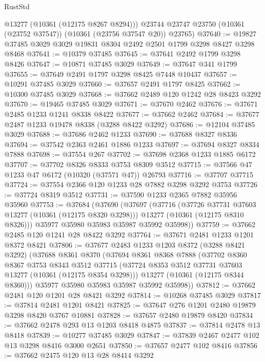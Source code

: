 \begin{lexlean}{RustStd}
\begin{coremodule}
        @13277
        (@10361 (@12175 @8267 @8294)))
      @23744
      @23747
      @23750
      (@10361 (@23752 @37547))
      (@10361 (@23756 @37547 @20))
      @23765)
@37640 := @19827 @37485 @3029 @3029 @19831 @8304 @2492 @2501 @1799 @3298 @8427 @3298 @8468
@37641 := @10379 @37485
@37645 := @37641 @2492 @1799 @3298 @8426
@37647 := @10871 @37485 @3029
@37649 := @37647 @341 @1799
@37655 := @37649 @2491 @1797 @3298 @8425 @7448 @10437
@37657 := @10291 @37485 @3029
@37660 := @37657 @2491 @1797 @8425
@37662 := @10300 @37485 @3029
@37668 := @37662 @2489 @120 @1242 @28 @8423 @3292
@37670 := @19465 @37485 @3029
@37671 := @37670 @2462
@37676 := @37671 @2485 @1233 @1241 @8338 @8422
@37677 := @37662 @2462
@37684 := @37677 @2487 @1233 @19478 @8338 (@3288 @8422 @3292)
@37686 := @12104 @37485 @3029
@37688 := @37686 @2462 @1233
@37690 := @37688 @8327 @8336
@37694 := @37542 @2363 @2461 @1886 @1233
@37697 := @37694 @8327 @8334 @7888
@37698 := @37554 @267
@37702 := @37698 @2368 @1233 @1885 @6172
@37707 := @37702 @8326 @8333 @3753 @8309 @3512
@37715 := @37566 @47 @1233 @47 @6172 (@10320 (@37571 @47)) @26793
@37716 := @37707 @37715
@37724 := @37554 @2366 @120 @1233 @28 @7882 @3298 @3292 @3753
@37726 := @37724 @8319 @3512
@37731 := @37590 @1233 @2365 @7882 @35956 @35960
@37753 := @37684
    (@37690
      (@37697
        (@37716
          (@37726 @37731 @37603 @13277 (@10361 (@12175 @8320 @3298)))
          @13277
          (@10361 (@12175 @8310 @8326)))
        @35977
        @35980
        @35983
        @35987
        @35992
        @35998))
@37759 := @37662 @2485 @120 @1241 @28 @8422 @3292
@37764 := @37671 @2481 @1233 @1201 @8372 @8421
@37806 := @37677
    @2483
    @1233
    @1203
    @8372
    (@3288 @8421 @3292)
    (@37688
      @8361
      @8370
      (@37694
        @8361
        @8368
        @7888
        (@37702
          @8360
          @8367
          @3753
          @8343
          @3512
          @37715
          (@37724 @8353 @3512 @37731 @37603 @13277 (@10361 (@12175 @8354 @3298)))
          @13277
          (@10361 (@12175 @8344 @8360)))
        @35977
        @35980
        @35983
        @35987
        @35992
        @35998))
@37812 := @37662 @2481 @120 @1201 @28 @8421 @3292
@37814 := @10268 @37485 @3029
@37817 := @37814 @2481 @1201 @8421
@37825 := @37647 @276 @1201 @2480 @19879 @3298 @8420 @3767 @10881
@37828 := @37657 @2480 @19879 @8420
@37834 := @37662 @2478 @293 @13 @1203 @8418 @4875
@37837 := @37814 @2478 @13 @8418
@37839 := @10277 @37485 @3029
@37847 := @37839 @2467 @2477 @102 @13 @3298 @8416 @3000 @2651
@37850 := @37657 @2477 @102 @8416
@37856 := @37662 @2475 @120 @13 @28 @8414 @3292

\end{coremodule}
\end{lexlean}

